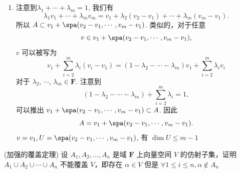 \begin{exercise}
\begin{exgroup}
\begin{answer}
\begin{enumerate}
            当$k=1$ 和 $k=2$ 时，结论是显然的.
            假设 $k$ 时成立,
            接下来对于 $k+1$ ($k+1\leqslant m$).
            我们假设$\lambda_1+\cdots+\lambda_{k+1}=1$.
            若 $\lambda_{k+1}=1$, 那么\[\sum_{j=1}^{k+1}\lambda_jv_j=v_{k+1}\in W.\]
            若$\lambda_{k+1}\ne 1$,那么\[ \frac{1}{1-\lambda_{k+1}}(\lambda_1+\cdots+\lambda_k)=1. \]
            由归纳假设，我们有\[ \frac{1}{1-\lambda_{k+1}}(\lambda_1v_1+\cdots+\lambda_kv_k)\in W. \]
            也有 \[ (1-a_{k+1})\left(\frac{1}{1-\lambda_{k+1}}(\lambda_1v_1+\cdots+\lambda_kv_k)\right)+a_{k+1}v_{k+1}\in W, \]
            即 \[ \lambda_1v_1+\cdots+\lambda_{k+1}v_{k+1}\in W. \]
            故而 $\lambda_1,\cdots,\lambda_m\in  \mathbf{F}$, $\lambda_1+\cdots+\lambda_m=1$,
            \[\lambda_1 v_1+\cdots+\lambda_m v_m\in W,\]有$A\subset W$.
        \item  注意到$\lambda_1+\cdots+\lambda_m=1$, 我们有\[ \lambda_1 v_1+\cdots+\lambda_m v_m=v_1+\lambda_2(v_2-v_1)+\cdots+\lambda_m(v_m-v_1). \]所以 $A\subset v_1+\spa(v_2-v_1,\cdots,v_m-v_1)$.
            类似的，对于任意\[v\in v_1+\spa(v_2-v_1,\cdots,v_m-v_1),\]$v$ 可以被写为 \[ v_1+\sum_{i=2}^m \lambda_i(v_i-v_1)=(1-\lambda_2-\cdots-\lambda_m)v_1+\sum_{i=2}^m \lambda_i v_i \]
            对于 $\lambda_2$, $\cdots$, $\lambda_m\in \mathbf{F}$. 注意到\[ (1-\lambda_2-\cdots-\lambda_m)+\sum_{i=2}^m \lambda_i=1, \]
            可以推出 $v_1+\spa(v_2-v_1,\cdots,v_m-v_1)\subset A$.
            因此\[A=v_1+\spa(v_2-v_1,\cdots,v_m-v_1).\]
            $v=v_1, U=\spa(v_2-v_1,\cdots,v_m-v_1)$, 有 $\dim U\le m-1$
        \end{enumerate}
    \end{answer}
            \item (加强的覆盖定理) 设 $A_1, A_2, \ldots, A_n$ 是域 $\mathbf{F}$ 上向量空间 $V$ 的仿射子集，证明 $A_1\cup A_2\cup \cdots \cup A_n$ 不能覆盖 $V$，即存在 $\alpha \in V$ 但是 $\forall 1\leqslant i\leqslant n, \alpha \notin A_n$
    \end{exgroup}
\end{exercise}
